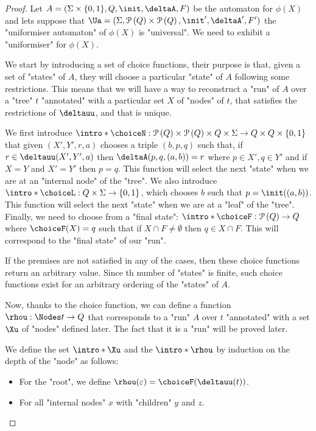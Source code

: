 \documentclass[a4paper,UKenglish,cleveref, autoref, thm-restate]{lipics-v2021}
\begin{document}
\begin{proof}
	Let $A =  (\Sigma \times \{0,1\}, Q, \init, \deltaA, F)$ be the automaton for $\phi(X)$ and lets suppose that
	$\Ua = (\Sigma, \parts Q \times \parts Q,\init', \deltaA', F')$ the "uniformiser automaton" of $\phi(X)$ is "universal".
	We need to exhibit a "uniformiser" for $\phi(X)$.

	\AP We start by introducing a set of choice functions, their purpose is that, given a set of "states" of $A$, they will choose
	a particular "state" of $A$ following some restrictions. This means that we will have a way to reconstruct a "run" of $A$ over a "tree" $t$ "annotated" with a
	particular set $X$ of "nodes" of $t$, that satisfies the restrictions of $\deltauu$, and that is unique.
	\begin{itemize}
		\itemAP We first introduce $\intro*\choiceN : \parts Q \times \parts Q \times Q \times \Sigma \to Q \times Q \times \set{0,1}$
		that given $(X',Y',r,a)$ chooses a triple $(b,p,q)$ such that, if $r \in \deltauu(X',Y', a)$ then $\deltaA(p,q,(a,b)) = r$ where $p \in X', q \in Y'$
		and if $X = Y$ and  $X' = Y'$ then $p = q$. This function will select the next "state" when we are at an "internal node" of the "tree".
		\itemAP We also introduce $\intro* \choiceL : Q \times \Sigma \to \set{0,1} $, which chooses $b$ such that $p = \init((a,b))$. This function
		will select the next "state" when we are at a "leaf" of the "tree".
		\itemAP
		Finally, we need to choose from a "final state": $\intro* \choiceF : \parts Q \to  Q$ where
		$\choiceF (X) = q$ such that if $X \cap F \neq \emptyset$ then $q \in X \cap F$. This will correspond to the "final state" of our "run".
	\end{itemize}
	If the premises are not satisfied in any of the cases, then these choice functions return an arbitrary value. Since th number of "states" is finite, such choice 
    functions exist for an arbitrary ordering of the "states" of $A$.

	Now, thanks to the choice function, we can define a function $\rhou : \Nodes t \to Q$ that corresponds to a "run" $A$ over $t$ "annotated" with a set $\Xu$ of "nodes" defined later.
	The fact that it is a "run" will be proved later.

	\AP We define the set $\intro*\Xu$ and the  $\intro*\rhou$  by induction on the depth of the "node" as follows:
	\begin{itemize}
		\item For the "root", we define $\rhou(\varepsilon) = \choiceF(\deltauu(t))$.
		\item For all "internal nodes" $x$ with "children" $y$ and $z$.


\end{itemize}
\end{proof}
\end{document}

